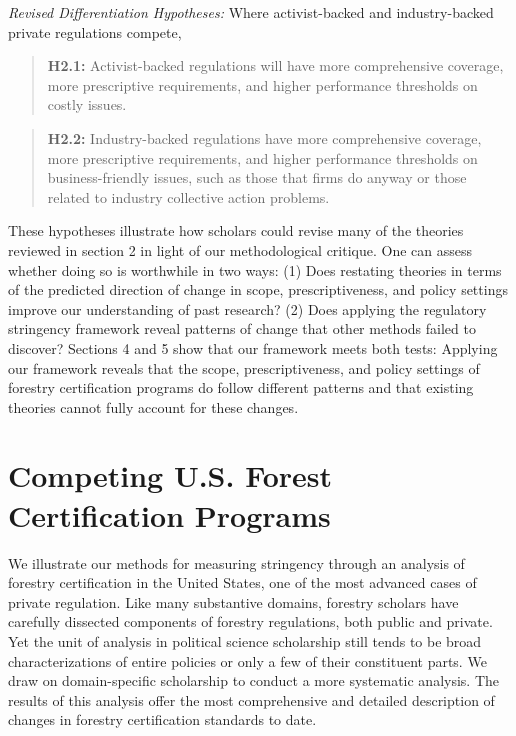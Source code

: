 \documentclass[
      12pt,
            Review ]{article}
\begin{document}
\emph{Revised Differentiation Hypotheses:} Where activist-backed and industry-backed private regulations compete,

\begin{quote}
\textbf{H2.1:} Activist-backed regulations will have more comprehensive coverage, more prescriptive requirements, and higher performance thresholds on costly issues.
\end{quote}

\begin{quote}
\textbf{H2.2:} Industry-backed regulations have more comprehensive coverage, more prescriptive requirements, and higher performance thresholds on business-friendly issues, such as those that firms do anyway or those related to industry collective action problems.
\end{quote}

These hypotheses illustrate how scholars could revise many of the theories reviewed in section 2 in light of our methodological critique. One can assess whether doing so is worthwhile in two ways: (1) Does restating theories in terms of the predicted direction of change in scope, prescriptiveness, and policy settings improve our understanding of past research? (2) Does applying the regulatory stringency framework reveal patterns of change that other methods failed to discover? Sections 4 and 5 show that our framework meets both tests: Applying our framework reveals that the scope, prescriptiveness, and policy settings of forestry certification programs do follow different patterns and that existing theories cannot fully account for these changes.

\hypertarget{competing-u.s.-forest-certification-programs}{%
\section{Competing U.S. Forest Certification Programs}\label{competing-u.s.-forest-certification-programs}}

We illustrate our methods for measuring stringency through an analysis of forestry certification in the United States, one of the most advanced cases of private regulation. Like many substantive domains, forestry scholars have carefully dissected components of forestry regulations, both public and private. Yet the unit of analysis in political science scholarship still tends to be broad characterizations of entire policies or only a few of their constituent parts. We draw on domain-specific scholarship to conduct a more systematic analysis. The results of this analysis offer the most comprehensive and detailed description of changes in forestry certification standards to date.
\end{document}
